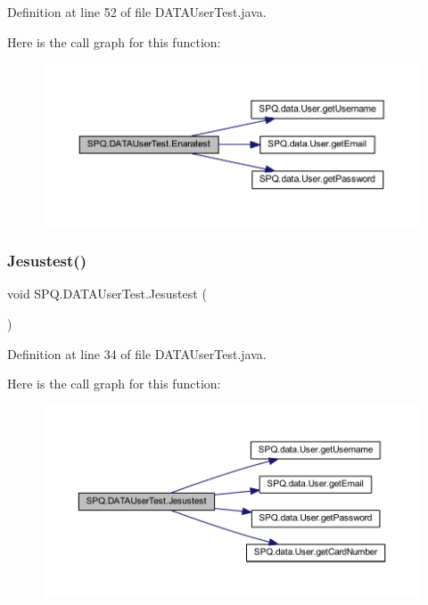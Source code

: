 Definition at line 52 of file D\+A\+T\+A\+User\+Test.\+java.

Here is the call graph for this function\+:
\nopagebreak
\begin{figure}[H]
\begin{center}
\leavevmode
\includegraphics[width=350pt]{class_s_p_q_1_1_d_a_t_a_user_test_a84d1c3d3992383e1cb93d07241cf3f02_cgraph}
\end{center}
\end{figure}
\mbox{\label{class_s_p_q_1_1_d_a_t_a_user_test_a29a15c9122a588e854a02c6c2fe1d203}} 
\subsubsection{\texorpdfstring{Jesustest()}{Jesustest()}}
{\footnotesize\ttfamily void S\+P\+Q.\+D\+A\+T\+A\+User\+Test.\+Jesustest (\begin{DoxyParamCaption}{ }\end{DoxyParamCaption})}



Definition at line 34 of file D\+A\+T\+A\+User\+Test.\+java.

Here is the call graph for this function\+:
\nopagebreak
\begin{figure}[H]
\begin{center}
\leavevmode
\includegraphics[width=350pt]{class_s_p_q_1_1_d_a_t_a_user_test_a29a15c9122a588e854a02c6c2fe1d203_cgraph}
\end{center}
\end{figure}
\mbox{\label{class_s_p_q_1_1_d_a_t_a_user_test_a703753b88018d83f5a2d3b76d335889a}} 

